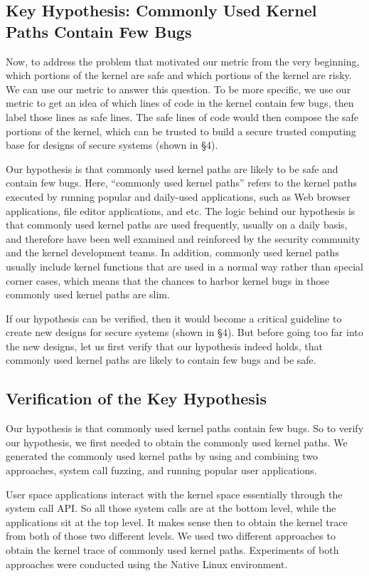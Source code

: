 \subsection{Key Hypothesis: Commonly Used Kernel Paths Contain Few Bugs}
Now, to address the problem that motivated our metric from the very beginning, which portions of the kernel 
are safe and which portions of the kernel are risky. We can use our metric to answer this question. To be more
specific, we use our metric to get an idea of which lines of code in the kernel contain few bugs, then label 
those lines as safe lines. The safe lines of code would then compose the safe portions of the kernel, which can 
be trusted to build a secure trusted computing base for designs of secure systems (shown in \S{4}). 

Our hypothesis is that commonly used kernel paths are likely to be safe and contain few bugs. 
Here, ``commonly used kernel paths'' refers to the kernel paths executed by running popular and 
daily-used applications, such as Web browser applications, file editor applications, and etc. 
The logic behind our hypothesis is that commonly used kernel paths are used frequently, usually 
on a daily basis, and therefore have been well examined and reinforced by the security community and
the kernel development teams. In addition, commonly used kernel paths usually include 
kernel functions that are used in a normal way rather than special corner cases, which means that the chances 
to harbor kernel bugs in those commonly used kernel paths are slim. 

If our hypothesis can be verified, then it would become a critical guideline to create new designs for secure systems 
(shown in \S{4}). 
But before going too far into the new designs, let us first verify that our hypothesis indeed holds, that 
commonly used kernel paths are likely to contain few bugs and be safe. 

\subsection{Verification of the Key Hypothesis}
Our hypothesis is that commonly used kernel paths contain few bugs. 
So to verify our hypothesis, we first needed to obtain the commonly used kernel paths. 
We generated the commonly used kernel paths by using and combining two approaches, 
system call fuzzing, and running popular user applications. 

User space applications interact with the kernel space essentially through the system call API. 
So all those system calls are at the bottom level, while the applications sit at the top level. 
It makes sense then to obtain the kernel trace from both of those two different levels. 
We used two different approaches to obtain the kernel trace of commonly used kernel paths. 
Experiments of both approaches were conducted using the Native Linux environment.

